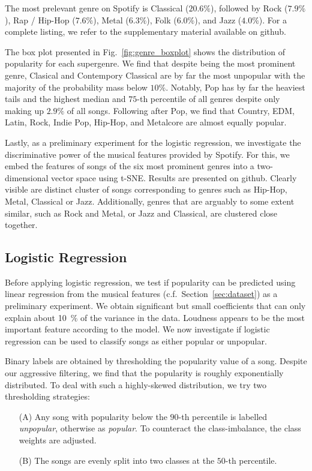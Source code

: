 \documentclass{article}
\begin{document}
The most prelevant genre on Spotify is Classical ($20.6\%$), followed by Rock ($7.9\%$), Rap / Hip-Hop ($7.6\%$), Metal ($6.3\%$), Folk ($6.0\%$), and Jazz ($4.0\%$). For a complete listing, we refer to the supplementary material available on github\footnotemark[5].

The box plot presented in Fig.~\ref{fig:genre_boxplot} shows the distribution of popularity for each supergenre. We find that despite  being the most prominent genre, Clasical and Contempory Classical are by far the most unpopular with the majority of the probability mass below $10\%$. Notably, Pop has by far the heaviest tails and the highest median and $75$-th percentile of all genres despite only making up $2.9\%$ of all songs. Following after Pop, we find that Country, EDM, Latin, Rock, Indie Pop, Hip-Hop, and Metalcore are almost equally popular.

Lastly, as a preliminary experiment for the logistic regression, we investigate the discriminative power of the musical features provided by Spotify. For this, we embed the features of songs of the six most prominent genres into a two-dimensional vector space using t-SNE. Results are presented on github. Clearly visible are distinct cluster of songs corresponding to genres such as Hip-Hop, Metal, Classical or Jazz. Additionally, genres that are arguably to some extent similar, such as Rock and Metal, or Jazz and Classical, are clustered close together.

\subsection{Logistic Regression}
Before applying logistic regression, we test if popularity can be predicted using linear regression from the musical features (c.f.~Section~\ref{sec:dataset}) as a preliminary experiment. We obtain significant but small coefficients that can only explain about \SI{10}{\percent} of the variance in the data. Loudness appears to be the most important feature according to the model. We now investigate if logistic regression can be used to classify songs as either popular or unpopular. 

Binary labels are obtained by thresholding the popularity value of a song. Despite our aggressive filtering, we find that the popularity is roughly exponentially distributed. To deal with such a highly-skewed distribution, we try two thresholding strategies:
\begin{enumerate}
  \item[(A)] Any song with popularity below the $90$-th percentile is labelled \emph{unpopular}, otherwise as \emph{popular}. To counteract the class-imbalance, the class weights are adjusted.
  \item[(B)] The songs are evenly split into two classes at the $50$-th percentile.
\end{enumerate}
\end{document}

